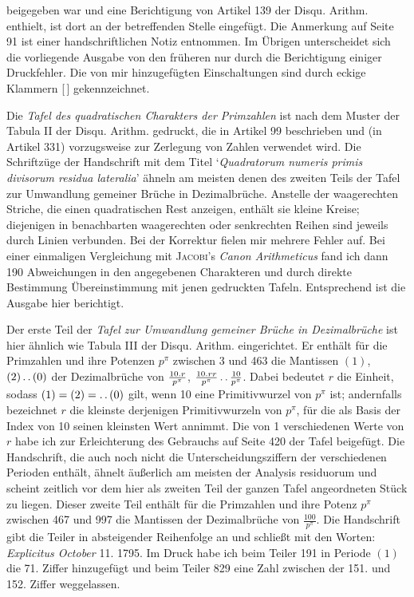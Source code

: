 beigegeben war und eine Berichtigung von Artikel 139 der Disqu. Arithm. enthielt, ist dort an der betreffenden Stelle eingefügt. Die Anmerkung auf Seite 91 ist einer handschriftlichen Notiz entnommen. Im Übrigen unterscheidet sich die vorliegende Ausgabe von den früheren nur durch die Berichtigung einiger Druckfehler. Die von mir hinzugefügten Einschaltungen sind durch eckige Klammern [\,] gekennzeichnet.
\par Die \textit{Tafel des quadratischen Charakters der Primzahlen} ist nach dem Muster der Tabula II der Disqu. Arithm. gedruckt, die in Artikel 99 beschrieben und (in Artikel 331) vorzugsweise zur Zerlegung von Zahlen verwendet wird. Die Schriftzüge der Handschrift mit dem Titel ‘\textit{Quadratorum numeris primis divisorum residua lateralia}’ ähneln am meisten denen des zweiten Teils der Tafel zur Umwandlung gemeiner Brüche in Dezimalbrüche. Anstelle der waagerechten Striche, die einen quadratischen Rest anzeigen, enthält sie kleine Kreise; diejenigen in benachbarten waagerechten oder senkrechten Reihen sind jeweils durch Linien verbunden. Bei der Korrektur fielen mir mehrere Fehler auf. Bei einer einmaligen Vergleichung mit \textsc{Jacobi}’s \textit{Canon Arithmeticus} fand ich dann 190 Abweichungen in den angegebenen Charakteren und durch direkte Bestimmung Übereinstimmung mit jenen gedruckten Tafeln. Entsprechend ist die Ausgabe hier berichtigt.
\par Der erste Teil der \textit{Tafel zur Umwandlung gemeiner Brüche in Dezimalbrüche} ist hier ähnlich wie Tabula III der Disqu. Arithm. eingerichtet. Er enthält für die Primzahlen und ihre Potenzen $p^\pi$ zwischen 3 und 463 die Mantissen $(1)$, $(2)\mathinner{.\,.}(0)$ der Dezimalbrüche von $\frac{10\mathbin{.} r}{p^\pi}$, $\frac{10\mathbin{.} rr}{p^\pi}\mathinner{.\,.}\frac{10}{p^\pi}$. Dabei bedeutet $r$ die Einheit, sodass $(1)=(2)=\mathinner{.\,.}(0)$ gilt, wenn 10 eine Primitivwurzel von $p^\pi$ ist; andernfalls bezeichnet $r$ die kleinste derjenigen Primitivwurzeln von $p^\pi$, für die als Basis der Index von 10 seinen kleinsten Wert annimmt. Die von 1 verschiedenen Werte von $r$ habe ich zur Erleichterung des Gebrauchs auf Seite 420 der Tafel beigefügt. Die Handschrift, die auch noch nicht die Unterscheidungsziffern der verschiedenen Perioden enthält, ähnelt äußerlich am meisten der Analysis residuorum und scheint zeitlich vor dem hier als zweiten Teil der ganzen Tafel angeordneten Stück zu liegen.
Dieser zweite Teil enthält für die Primzahlen und ihre Potenz $p^\pi$ zwischen 467 und 997 die Mantissen der Dezimalbrüche von $\frac{100}{p^\pi}$. Die Handschrift gibt die Teiler in absteigender Reihenfolge an und schließt mit den Worten: \textit{Explicitus October} 11. 1795. Im Druck habe ich beim Teiler 191 in Periode $(1)$ die 71. Ziffer hinzugefügt und beim Teiler 829 eine Zahl zwischen der 151. und 152. Ziffer weggelassen.
